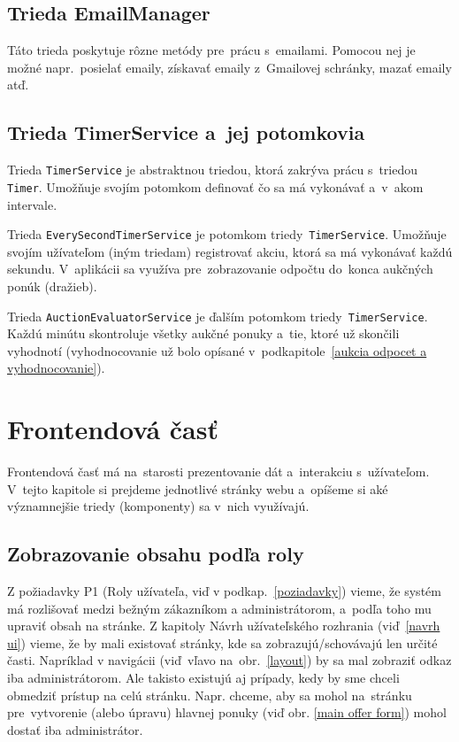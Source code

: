 \subsection{Trieda EmailManager}
\label{trieda emailmanager}

Táto trieda poskytuje rôzne metódy pre~prácu s~emailami. Pomocou nej je možné napr.~posielať emaily, získavať emaily z~Gmailovej schránky, mazať emaily atď.

\subsection{Trieda TimerService a~jej potomkovia}
\label{trieda timerservice}

Trieda \verb|TimerService| je abstraktnou triedou, ktorá zakrýva prácu s~triedou \verb|Timer|. Umožňuje svojím potomkom definovať čo sa má vykonávať a~v~akom intervale.

Trieda \verb|EverySecondTimerService| je potomkom triedy~\verb|TimerService|. Umožňuje svojím užívateľom (iným triedam) registrovať akciu, ktorá sa má vykonávať každú sekundu. V~aplikácii sa využíva pre~zobrazovanie odpočtu do~konca aukčných ponúk (dražieb).

Trieda \verb|AuctionEvaluatorService| je ďalším potomkom triedy~\verb|TimerService|. Každú minútu skontroluje všetky aukčné ponuky a~tie, ktoré už skončili vyhodnotí (vyhodnocovanie už bolo opísané v~podkapitole~\ref{aukcia odpocet a vyhodnocovanie}).

\section{Frontendová časť}

Frontendová časť má na~starosti prezentovanie dát a~interakciu s~užívateľom. V~tejto kapitole si prejdeme jednotlivé stránky webu a~opíšeme si aké významnejšie triedy (komponenty) sa v~nich využívajú.

\subsection{Zobrazovanie obsahu podľa roly}
\label{zobrazovanie obsahu podla roly}

Z požiadavky P1 (Roly užívateľa, viď v podkap.~\ref{poziadavky}) vieme, že systém má rozlišovať medzi bežným zákazníkom a administrátorom, a~podľa toho mu upraviť obsah na stránke. Z kapitoly Návrh užívateľského rozhrania (viď~\ref{navrh ui}) vieme, že by mali existovať stránky, kde sa zobrazujú/schovávajú len určité časti. Napríklad v navigácii (viď~vľavo na~obr.~\ref{layout}) by sa mal zobraziť odkaz  iba administrátorom. Ale takisto existujú aj prípady, kedy by sme chceli obmedziť prístup na celú stránku. Napr. chceme, aby sa mohol na~stránku pre~vytvorenie (alebo úpravu) hlavnej ponuky (viď obr. \ref{main offer form}) mohol dostať iba administrátor.

